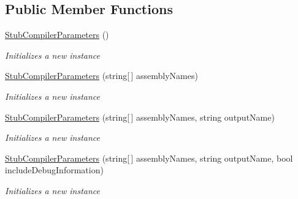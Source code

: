 \subsection*{Public Member Functions}
\begin{DoxyCompactItemize}
\item 
\hyperlink{class_system_1_1_code_dom_1_1_compiler_1_1_fakes_1_1_stub_compiler_parameters_abc6d4dd865a509403f9194842af4957e}{Stub\-Compiler\-Parameters} ()
\begin{DoxyCompactList}\small\item\em Initializes a new instance\end{DoxyCompactList}\item 
\hyperlink{class_system_1_1_code_dom_1_1_compiler_1_1_fakes_1_1_stub_compiler_parameters_a408eb17eb731c67cfa879309a94a0118}{Stub\-Compiler\-Parameters} (string\mbox{[}$\,$\mbox{]} assembly\-Names)
\begin{DoxyCompactList}\small\item\em Initializes a new instance\end{DoxyCompactList}\item 
\hyperlink{class_system_1_1_code_dom_1_1_compiler_1_1_fakes_1_1_stub_compiler_parameters_a74272684b7ebd6cc6048c8e6d3a885e8}{Stub\-Compiler\-Parameters} (string\mbox{[}$\,$\mbox{]} assembly\-Names, string output\-Name)
\begin{DoxyCompactList}\small\item\em Initializes a new instance\end{DoxyCompactList}\item 
\hyperlink{class_system_1_1_code_dom_1_1_compiler_1_1_fakes_1_1_stub_compiler_parameters_a94c3147274ca82eb51b30b93901405a1}{Stub\-Compiler\-Parameters} (string\mbox{[}$\,$\mbox{]} assembly\-Names, string output\-Name, bool include\-Debug\-Information)
\begin{DoxyCompactList}\small\item\em Initializes a new instance\end{DoxyCompactList}\end{DoxyCompactItemize}
